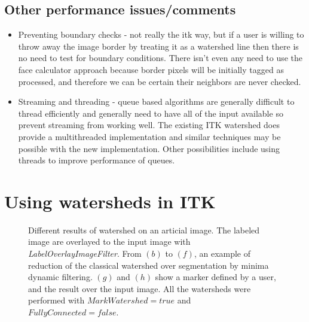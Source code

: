 \documentclass{InsightArticle}
\begin{document}
\subsection{Other performance issues/comments}
\begin{itemize}
\item Preventing boundary checks - not really the itk way, but if a user is
willing to throw away the image border by treating it as a watershed
line then there is no need to test for boundary conditions. There
isn't even any need to use the face calculator approach because border
pixels will be initially tagged as processed, and therefore we can be
certain their neighbors are never checked.
\item Streaming and threading  - queue based algorithms are generally difficult 
to thread efficiently and generally need to have all of the input
available so prevent streaming from working well. The existing ITK
watershed does provide a multithreaded implementation and similar
techniques may be possible with the new implementation. Other
possibilities include using threads to improve performance of queues.
\end{itemize}


\section{Using watersheds in ITK}



\begin{figure}[htbp]
\begin{center}
\caption{Different results of watershed on an articial image. The labeled image are overlayed to the input image with {\em LabelOverlayImageFilter}. From $(b)$ to $(f)$, an example of reduction of the classical watershed over segmentation by minima dynamic filtering. $(g)$ and $(h)$ show a marker defined by a user, and the result over the input image. All the watersheds were performed with $MarkWatershed = true$ and $FullyConnected = false$.}
\end{center}
\end{figure}
\end{document}
